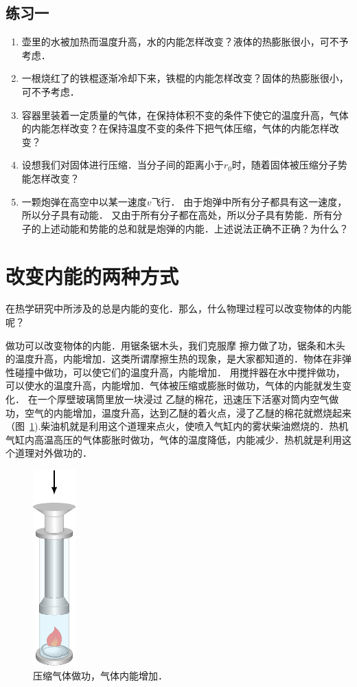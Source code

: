 \subsection*{练习一}
\begin{enumerate}
\item 壶里的水被加热而温度升高，水的内能怎样改变？液体的热膨胀很小，可不予考虑．
\item 一根烧红了的铁棍逐渐冷却下来，铁棍的内能怎样改变？固体的热膨胀很小，可不予考虑．
\item 容器里装着一定质量的气体，在保持体积不变的条件下使它的温度升高，气体的内能怎样改变？在保持温度不变的条件下把气体压缩，气体的内能怎样改变？
\item 设想我们对固体进行压缩．当分子间的距离小于$r_0$时，随着固体被压缩分子势能怎样改变？
\item 一颗炮弹在高空中以某一速度$v$飞行．
由于炮弹中所有分子都具有这一速度，所以分子具有动能．
又由于所有分子都在高处，所以分子具有势能．所有分子的上述动能和势能的总和就是炮弹的内能．上述说法正确不正确？为什么？
\end{enumerate}

\section{改变内能的两种方式}
在热学研究中所涉及的总是内能的变化．那么，什么物理过程可以改变物体的内能呢？

做功可以改变物体的内能．用锯条锯木头，我们克服摩
擦力做了功，锯条和木头的温度升高，内能增加．这类所谓摩擦生热的现象，是大家都知道的．物体在非弹性碰撞中做功，可以使它们的温度升高，内能增加．
用搅拌器在水中搅拌做功，可以使水的温度升高，内能增加．气体被压缩或膨胀时做功，气体的内能就发生变化．
在一个厚壁玻璃筒里放一块浸过
乙醚的棉花，迅速压下活塞对筒内空气做功，空气的内能增加，温度升高，达到乙醚的着火点，浸了乙醚的棉花就燃烧起来（图~\ref{fig_B_2-1}).柴油机就是利用这个道理来点火，使喷入气缸内的雾状柴油燃烧的．热机气缸内高温高压的气体膨胀时做功，气体的温度降低，内能减少．热机就是利用这个道理对外做功的．

\begin{figure}[htbp]
    \centering
    \includegraphics{fig/B/2-1.pdf}
    \caption{压缩气体做功，气体内能增加．}\label{fig_B_2-1}
\end{figure}

